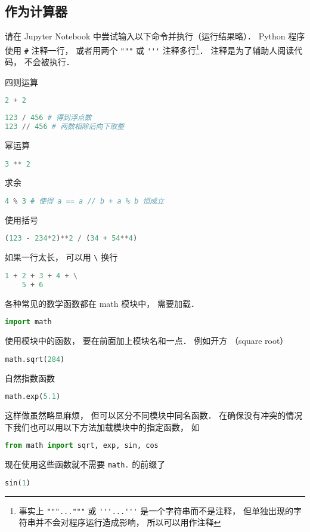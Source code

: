 \subsection{作为计算器}
请在 Jupyter Notebook 中尝试输入以下命令并执行（运行结果略）． Python 程序使用 \verb|#| 注释一行，  或者用两个 \verb|"""| 或 \verb|'''| 注释多行\footnote{事实上 \lstinline|"""..."""| 或 \lstinline|'''...'''| 是一个字符串而不是注释， 但单独出现的字符串并不会对程序运行造成影响， 所以可以用作注释}． 注释是为了辅助人阅读代码， 不会被执行．

四则运算
\begin{lstlisting}[language=python]
2 + 2
\end{lstlisting}
\begin{lstlisting}[language=python]
123 / 456 # 得到浮点数
123 // 456 # 两数相除后向下取整
\end{lstlisting}
幂运算
\begin{lstlisting}[language=python]
3 ** 2
\end{lstlisting}
求余
\begin{lstlisting}[language=python]
4 % 3 # 使得 a == a // b + a % b 恒成立
\end{lstlisting}
使用括号
\begin{lstlisting}[language=python]
(123 - 234*2)**2 / (34 + 54**4)
\end{lstlisting}
如果一行太长， 可以用 \verb|\| 换行
\begin{lstlisting}[language=python]
1 + 2 + 3 + 4 + \
    5 + 6
\end{lstlisting}
各种常见的数学函数都在 math 模块中， 需要加载．
\begin{lstlisting}[language=python]
import math
\end{lstlisting}
使用模块中的函数， 要在前面加上模块名和一点． 例如开方 （square root）
\begin{lstlisting}[language=python]
math.sqrt(284)
\end{lstlisting}
自然指数函数
\begin{lstlisting}[language=python]
math.exp(5.1)
\end{lstlisting}
这样做虽然略显麻烦， 但可以区分不同模块中同名函数． 在确保没有冲突的情况下我们也可以用以下方法加载模块中的指定函数， 如
\begin{lstlisting}[language=python]
from math import sqrt, exp, sin, cos
\end{lstlisting}
现在使用这些函数就不需要 \verb|math.| 的前缀了
\begin{lstlisting}[language=python]
sin(1)
\end{lstlisting}
